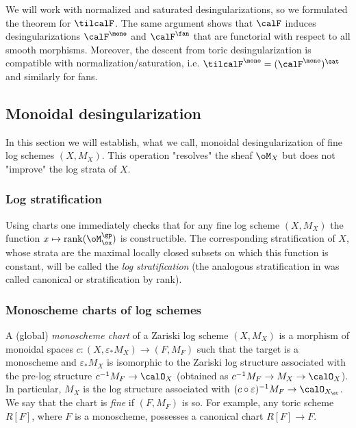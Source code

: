 \documentclass[10pt]{../fichiers-configuration-latex/smfart}
\begin{document}
\begin{remark2} We will work with normalized and saturated
desingularizations, so we formulated the theorem for $\tilcalF$. The
same argument shows that $\calF$ induces desingularizations
$\calF^\mono$ and $\calF^\fan$ that are functorial with respect
to all smooth morphisms. Moreover, the descent from toric
desingularization is compatible with normalization/saturation,
i.e. $\tilcalF^\mono=(\calF^\mono)^\sat$ and similarly for fans.
\end{remark2}

\subsection{Monoidal desingularization}\label{8-logfansec} In this
section we will establish, what we call, monoidal desingularization
of fine log schemes $(X,M_X)$. This operation "resolves" the sheaf
$\oM_X$ but does not "improve" the log strata of $X$.

\subsubsection{Log stratification}\label{8-logstratsec}
Using charts one immediately checks that for any fine log scheme $(X,M_X)$
the function $x\mapsto {\rm rank}(\oM^\gp_\ox)$ is constructible.
The corresponding stratification of $X$, whose strata are the maximal locally
closed subsets on which this function is constant, will be called
the {\em log stratification} (the analogous stratification in  was called
canonical or stratification by rank).

\subsubsection{Monoscheme charts of log
schemes}\label{8-monochartsec} A (global) {\em monoscheme
chart} of a Zariski log scheme $(X,M_X)$ is a morphism of
monoidal spaces $c{\colon}(X,\varepsilon_*M_X)\to(F,{M}_F)$
such that the target is a monoscheme and $\varepsilon_*M_X$
is isomorphic to the Zariski log structure associated with the
pre-log structure $c^{-1}M_F\to\calO_X$ (obtained as $c^{-1}M_F\to
M_X\to\calO_X$). In particular, $M_X$ is the log structure associated
with $(c\circ\varepsilon)^{-1}M_F\to\calO_{X_\et}$. We say that
the chart is {\em fine} if $(F,M_F)$ is so. For example, any toric
scheme $R[F]$, where $F$ is a monoscheme, possesses a canonical
chart $R[F]\to F$.
\end{document}
